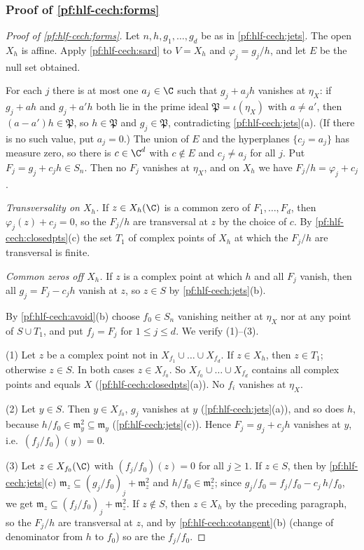 \subsubsection{Proof of \texorpdfstring{\cref{pf:hlf-cech:forms}}{the theorem}}

\begin{proof}[Proof of \cref{pf:hlf-cech:forms}]
Let $n,h,g_1,\dots,g_d$ be as in \cref{pf:hlf-cech:jets}. The open $X_h$ is affine. Apply \cref{pf:hlf-cech:sard} to $V=X_h$ and
$\varphi_j=g_j/h$, and let $E$ be the null set obtained.

For each $j$ there is at most one $a_j\in\C$ such that $g_j+a_jh$ vanishes at $\eta_X$: if $g_j+ah$ and $g_j+a'h$ both lie in the prime ideal
$\mathfrak P=\iota(\eta_X)$ with $a\ne a'$, then $(a-a')h\in\mathfrak P$, so $h\in\mathfrak P$ and $g_j\in\mathfrak P$, contradicting
\cref{pf:hlf-cech:jets}(a). (If there is no such value, put $a_j=0$.) The union of $E$ and the hyperplanes $\{c_j=a_j\}$ has measure zero, so
there is $c\in\C^d$ with $c\notin E$ and $c_j\ne a_j$ for all $j$. Put $F_j=g_j+c_jh\in S_n$. Then no $F_j$ vanishes at $\eta_X$, and on $X_h$ we have
$F_j/h=\varphi_j+c_j$.

\emph{Transversality on $X_h$.} If $z\in X_h(\C)$ is a common zero of $F_1,\dots,F_d$, then $\varphi_j(z)+c_j=0$, so the $F_j/h$ are transversal at
$z$ by the choice of $c$. By \cref{pf:hlf-cech:closedpts}(c) the set $T_1$ of complex points of $X_h$ at which the $F_j/h$ are transversal is
finite.

\emph{Common zeros off $X_h$.} If $z$ is a complex point at which $h$ and all $F_j$ vanish, then all $g_j=F_j-c_jh$ vanish at $z$, so $z\in S$ by
\cref{pf:hlf-cech:jets}(b).

By \cref{pf:hlf-cech:avoid}(b) choose $f_0\in S_n$ vanishing neither at $\eta_X$ nor at any point of $S\cup T_1$, and put $f_j=F_j$ for
$1\le j\le d$. We verify (1)--(3).

(1) Let $z$ be a complex point not in $X_{f_1}\cup\dots\cup X_{f_d}$. If $z\in X_h$, then $z\in T_1$; otherwise $z\in S$. In both cases
$z\in X_{f_0}$. So $X_{f_0}\cup\dots\cup X_{f_d}$ contains all complex points and equals $X$ (\cref{pf:hlf-cech:closedpts}(a)). No $f_i$ vanishes
at $\eta_X$.

(2) Let $y\in S$. Then $y\in X_{f_0}$, $g_j$ vanishes at $y$ (\cref{pf:hlf-cech:jets}(a)), and so does $h$, because $h/f_0\in\mathfrak m_y^2\subseteq
\mathfrak m_y$ (\cref{pf:hlf-cech:jets}(c)). Hence $F_j=g_j+c_jh$ vanishes at $y$, i.e.\ $(f_j/f_0)(y)=0$.

(3) Let $z\in X_{f_0}(\C)$ with $(f_j/f_0)(z)=0$ for all $j\ge1$. If $z\in S$, then by \cref{pf:hlf-cech:jets}(c)
$\mathfrak m_z\subseteq(g_j/f_0)_j+\mathfrak m_z^2$ and $h/f_0\in\mathfrak m_z^2$; since $g_j/f_0=f_j/f_0-c_j\,h/f_0$, we get
$\mathfrak m_z\subseteq(f_j/f_0)_j+\mathfrak m_z^2$. If $z\notin S$, then $z\in X_h$ by the preceding paragraph, so the $F_j/h$ are transversal at
$z$, and by \cref{pf:hlf-cech:cotangent}(b) (change of denominator from $h$ to $f_0$) so are the $f_j/f_0$.
\end{proof}

